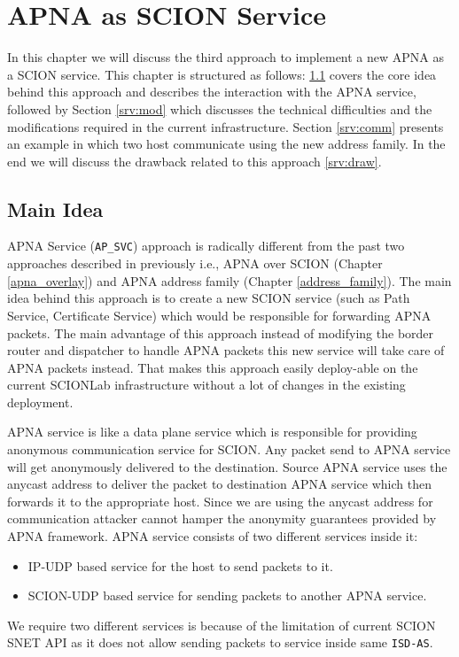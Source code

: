 
\chapter{APNA as SCION Service} %

\label{apna_service}
In this chapter we will discuss the third approach to implement a new APNA as a SCION service. This chapter is structured as follows: \ref{ser:main_idea} covers the core idea behind this approach and describes the interaction with the APNA service, followed by Section \ref{srv:mod} which discusses the technical difficulties and the modifications required in the current infrastructure. Section \ref{srv:comm} presents an example in which two host communicate using the new address family. In the end we will discuss the drawback related to this approach \ref{srv:draw}. 

\section{Main Idea} \label{ser:main_idea}
APNA Service (\texttt{AP\_SVC}) approach is radically different from the past two approaches described in previously i.e., APNA over SCION (Chapter \ref{apna_overlay}) and APNA address family (Chapter \ref{address_family}). The main idea behind this approach is to create a new SCION service (such as Path Service, Certificate Service) which would be responsible for forwarding APNA packets. The main advantage of this approach instead of modifying the border router and dispatcher to handle APNA packets this new service will take care of APNA packets instead. That makes this approach easily deploy-able on the current SCIONLab infrastructure without a lot of changes in the existing deployment.

APNA service is like a data plane service which is responsible for providing anonymous communication service for SCION. Any packet send to APNA service will get anonymously delivered to the destination. Source APNA service uses the anycast address to deliver the packet to destination APNA service which then forwards it to the appropriate host. Since we are using the anycast address for communication attacker cannot hamper the anonymity guarantees provided by APNA framework. APNA service consists of two different services inside it:
\begin{itemize}
    \item IP-UDP based service for the host to send packets to it.
    \item SCION-UDP based service for sending packets to another APNA service.
\end{itemize}
We require two different services is because of the limitation of current SCION SNET API as it does not allow sending packets to service inside same \texttt{ISD-AS}.

